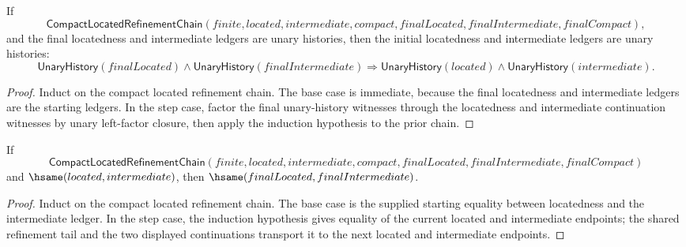 \begin{theorem}
\label{thm:compact-located-refinement-chain-initial-endpoints-unary}
If
$$
\mathsf{CompactLocatedRefinementChain}(finite,located,intermediate,compact,finalLocated,finalIntermediate,finalCompact),
$$
and the final locatedness and intermediate ledgers are unary histories, then
the initial locatedness and intermediate ledgers are unary histories:
$$
\mathsf{UnaryHistory}(finalLocated)\land
\mathsf{UnaryHistory}(finalIntermediate)
\Longrightarrow
\mathsf{UnaryHistory}(located)\land
\mathsf{UnaryHistory}(intermediate).
$$
\end{theorem}
\begin{proof}
Induct on the compact located refinement chain. The base case is immediate,
because the final locatedness and intermediate ledgers are the starting
ledgers. In the step case, factor the final unary-history witnesses through
the locatedness and intermediate continuation witnesses by unary left-factor
closure, then apply the induction hypothesis to the prior chain.
\end{proof}

\begin{theorem}
\label{thm:compact-located-refinement-chain-endpoint-hsame}
If
$$
\mathsf{CompactLocatedRefinementChain}(finite,located,intermediate,compact,finalLocated,finalIntermediate,finalCompact)
$$
and $\hsame(located,intermediate)$, then
$\hsame(finalLocated,finalIntermediate)$.
\end{theorem}
\begin{proof}
Induct on the compact located refinement chain. The base case is the supplied
starting equality between locatedness and the intermediate ledger. In the step
case, the induction hypothesis gives equality of the current located and
intermediate endpoints; the shared refinement tail and the two displayed
continuations transport it to the next located and intermediate endpoints.
\end{proof}

